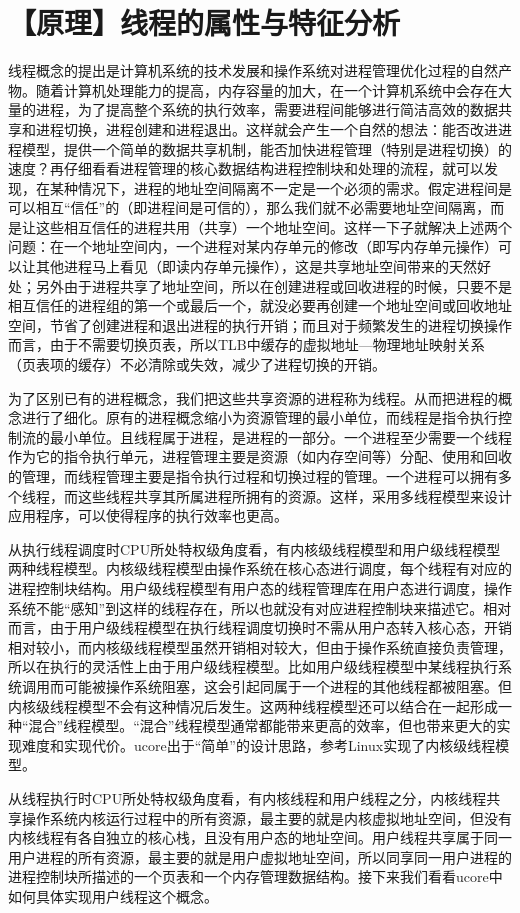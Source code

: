 \section{【原理】线程的属性与特征分析}\label{ux539fux7406ux7ebfux7a0bux7684ux5c5eux6027ux4e0eux7279ux5f81ux5206ux6790}

线程概念的提出是计算机系统的技术发展和操作系统对进程管理优化过程的自然产物。随着计算机处理能力的提高，内存容量的加大，在一个计算机系统中会存在大量的进程，为了提高整个系统的执行效率，需要进程间能够进行简洁高效的数据共享和进程切换，进程创建和进程退出。这样就会产生一个自然的想法：能否改进进程模型，提供一个简单的数据共享机制，能否加快进程管理（特别是进程切换）的速度？再仔细看看进程管理的核心数据结构进程控制块和处理的流程，就可以发现，在某种情况下，进程的地址空间隔离不一定是一个必须的需求。假定进程间是可以相互``信任''的（即进程间是可信的），那么我们就不必需要地址空间隔离，而是让这些相互信任的进程共用（共享）一个地址空间。这样一下子就解决上述两个问题：在一个地址空间内，一个进程对某内存单元的修改（即写内存单元操作）可以让其他进程马上看见（即读内存单元操作），这是共享地址空间带来的天然好处；另外由于进程共享了地址空间，所以在创建进程或回收进程的时候，只要不是相互信任的进程组的第一个或最后一个，就没必要再创建一个地址空间或回收地址空间，节省了创建进程和退出进程的执行开销；而且对于频繁发生的进程切换操作而言，由于不需要切换页表，所以TLB中缓存的虚拟地址---物理地址映射关系（页表项的缓存）不必清除或失效，减少了进程切换的开销。

为了区别已有的进程概念，我们把这些共享资源的进程称为线程。从而把进程的概念进行了细化。原有的进程概念缩小为资源管理的最小单位，而线程是指令执行控制流的最小单位。且线程属于进程，是进程的一部分。一个进程至少需要一个线程作为它的指令执行单元，进程管理主要是资源（如内存空间等）分配、使用和回收的管理，而线程管理主要是指令执行过程和切换过程的管理。一个进程可以拥有多个线程，而这些线程共享其所属进程所拥有的资源。这样，采用多线程模型来设计应用程序，可以使得程序的执行效率也更高。

从执行线程调度时CPU所处特权级角度看，有内核级线程模型和用户级线程模型两种线程模型。内核级线程模型由操作系统在核心态进行调度，每个线程有对应的进程控制块结构。用户级线程模型有用户态的线程管理库在用户态进行调度，操作系统不能``感知''到这样的线程存在，所以也就没有对应进程控制块来描述它。相对而言，由于用户级线程模型在执行线程调度切换时不需从用户态转入核心态，开销相对较小，而内核级线程模型虽然开销相对较大，但由于操作系统直接负责管理，所以在执行的灵活性上由于用户级线程模型。比如用户级线程模型中某线程执行系统调用而可能被操作系统阻塞，这会引起同属于一个进程的其他线程都被阻塞。但内核级线程模型不会有这种情况后发生。这两种线程模型还可以结合在一起形成一种``混合''线程模型。``混合''线程模型通常都能带来更高的效率，但也带来更大的实现难度和实现代价。ucore出于``简单''的设计思路，参考Linux实现了内核级线程模型。

从线程执行时CPU所处特权级角度看，有内核线程和用户线程之分，内核线程共享操作系统内核运行过程中的所有资源，最主要的就是内核虚拟地址空间，但没有内核线程有各自独立的核心栈，且没有用户态的地址空间。用户线程共享属于同一用户进程的所有资源，最主要的就是用户虚拟地址空间，所以同享同一用户进程的进程控制块所描述的一个页表和一个内存管理数据结构。接下来我们看看ucore中如何具体实现用户线程这个概念。
